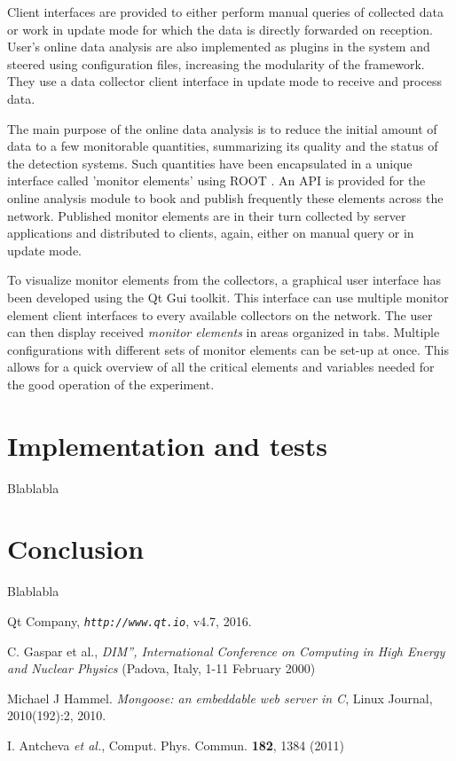\documentclass[conference]{IEEEtran}
\begin{document}
Client interfaces are provided to either perform manual queries of collected data or work in update mode for which the data is directly forwarded on reception. User's online data analysis are also implemented as plugins in the system and steered using configuration files, increasing the modularity of the framework. They use a data collector client interface in update mode to receive and process data. 

The main purpose of the online data analysis is to reduce the initial amount of data to a few monitorable quantities, summarizing its quality and the status of the detection systems. Such quantities have been encapsulated in a unique interface called 'monitor elements' using ROOT \cite{ROOT}. An API is provided for the online analysis module to book and publish frequently these elements across the network. Published monitor elements are in their turn collected by server applications and distributed to clients, again, either on manual query or in update mode.

To visualize monitor elements from the collectors, a graphical user interface has been developed using the Qt \cite{QT} Gui toolkit. This interface can use multiple monitor element client interfaces to every available collectors on the network. The user can then display received \textit{monitor elements} in areas organized in tabs. Multiple configurations with different sets of monitor elements can be set-up at once. This allows for a quick overview of all the critical elements and variables needed for the good operation of the experiment.

\section{Implementation and tests}
Blablabla

\section{Conclusion}
Blablabla


\begin{thebibliography}{1}

  
Qt Company, \emph{\tt http://www.qt.io}, v4.7, 2016.

C. Gaspar et al., \emph{DIM”, International Conference on Computing in High Energy and Nuclear Physics} (Padova,  Italy,
1-11 February 2000)

Michael J Hammel. \emph{Mongoose: an embeddable web server in C}, Linux Journal, 2010(192):2, 2010.

I. Antcheva \textit{et al.}, Comput. Phys. Commun. \textbf{182}, 1384 (2011)

\end{thebibliography}
\end{document}
